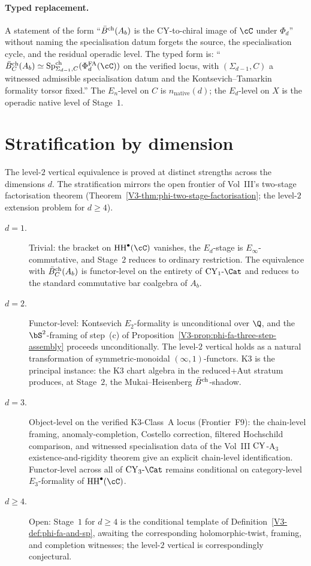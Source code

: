 \paragraph{Typed replacement.}
A statement of the form
``$\bar{B}^{\mathrm{ch}}(A_b)$ is the CY-to-chiral image of $\cC$ under $\Phi_d$''
without naming the specialisation datum forgets the source, the
specialisation cycle, and the residual operadic level. The typed form is:
``$\Bbarch_C(A_b)\simeq \SpCh_{\Sigma_{d-1},C}(\PhiFA_d(\cC))$
on the verified locus, with $(\Sigma_{d-1},C)$ a witnessed admissible
specialisation datum and the Kontsevich--Tamarkin formality torsor
fixed.'' The $E_n$-level on $C$ is $n_{\mathrm{native}}(d)$; the
$E_d$-level on $X$ is the operadic native level of Stage~$1$.

\section{Stratification by dimension}
\label{sec:vert-level-2-stratification}

The level-$2$ vertical equivalence is proved at distinct strengths
across the dimensions $d$. The stratification mirrors the open
frontier of Vol~III's two-stage factorisation theorem
(Theorem~\ref{V3-thm:phi-two-stage-factorisation}; the level-$2$
extension problem for $d\geq 4$).

\begin{description}
 \item[$d=1$.] Trivial: the bracket on $\HH^\bullet(\cC)$ vanishes,
 the $E_d$-stage is $E_\infty$-commutative, and Stage~$2$ reduces to
 ordinary restriction. The equivalence with $\bar{B}^{\mathrm{ch}}_C(A_b)$ is
 functor-level on the entirety of $\CY_1\text{-}\Cat$ and reduces
 to the standard commutative bar coalgebra of $A_b$.

 \item[$d=2$.] Functor-level: Kontsevich $E_2$-formality is
 unconditional over $\Q$, and the $\bS^2$-framing of step~(c) of
 Proposition~\ref{V3-prop:phi-fa-three-step-assembly} proceeds
 unconditionally. The level-$2$ vertical
 holds as a natural transformation of symmetric-monoidal
 $(\infty,1)$-functors. K3 is the principal instance: the K3 chart
 algebra in the reduced+$\mathrm{Aut}$ stratum produces, at
 Stage~$2$, the Mukai--Heisenberg $\bar{B}^{\mathrm{ch}}$-shadow.

 \item[$d=3$.] Object-level on the verified K3-Class~A locus
 (Frontier~F9): the chain-level framing, anomaly-completion, Costello
 correction, filtered Hochschild comparison, and witnessed
 specialisation data of the Vol~III $\mathrm{CY}$-A$_3$ existence-and-rigidity
 theorem give an explicit chain-level identification. Functor-level
 across all of $\CY_3\text{-}\Cat$ remains conditional on
 category-level $E_3$-formality of $\HH^\bullet(\cC)$.

 \item[$d\geq 4$.] Open: Stage~$1$ for $d\geq 4$ is the conditional
 template of Definition~\ref{V3-def:phi-fa-and-sp}, awaiting the
 corresponding holomorphic-twist, framing, and completion witnesses;
 the level-$2$ vertical is correspondingly conjectural.
\end{description}


